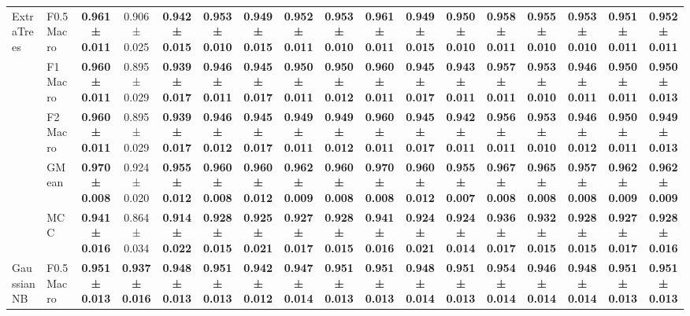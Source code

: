 \begin{table}[H]
{\begin{tabular}{llccccccccccccccc}
\cline{1-17}
\multirow[t]{5}{*}{ExtraTrees} & F0.5 Macro & \textbf{0.961 ± 0.011} & 0.906 ± 0.025 & \textbf{0.942 ± 0.015} & \textbf{0.953 ± 0.010} & \textbf{0.949 ± 0.015} & \textbf{0.952 ± 0.011} & \textbf{0.953 ± 0.010} & \textbf{0.961 ± 0.011} & \textbf{0.949 ± 0.015} & \textbf{0.950 ± 0.010} & \textbf{0.958 ± 0.011} & \textbf{0.955 ± 0.010} & \textbf{0.953 ± 0.010} & \textbf{0.951 ± 0.011} & \textbf{0.952 ± 0.011} \\
 & F1 Macro & \textbf{0.960 ± 0.011} & 0.895 ± 0.029 & \textbf{0.939 ± 0.017} & \textbf{0.946 ± 0.011} & \textbf{0.945 ± 0.017} & \textbf{0.950 ± 0.011} & \textbf{0.950 ± 0.012} & \textbf{0.960 ± 0.011} & \textbf{0.945 ± 0.017} & \textbf{0.943 ± 0.011} & \textbf{0.957 ± 0.011} & \textbf{0.953 ± 0.010} & \textbf{0.946 ± 0.011} & \textbf{0.950 ± 0.011} & \textbf{0.950 ± 0.013} \\
 & F2 Macro & \textbf{0.960 ± 0.011} & 0.895 ± 0.029 & \textbf{0.939 ± 0.017} & \textbf{0.946 ± 0.012} & \textbf{0.945 ± 0.017} & \textbf{0.949 ± 0.011} & \textbf{0.949 ± 0.012} & \textbf{0.960 ± 0.011} & \textbf{0.945 ± 0.017} & \textbf{0.942 ± 0.011} & \textbf{0.956 ± 0.011} & \textbf{0.953 ± 0.010} & \textbf{0.946 ± 0.012} & \textbf{0.950 ± 0.011} & \textbf{0.949 ± 0.013} \\
 & GMean & \textbf{0.970 ± 0.008} & 0.924 ± 0.020 & \textbf{0.955 ± 0.012} & \textbf{0.960 ± 0.008} & \textbf{0.960 ± 0.012} & \textbf{0.962 ± 0.009} & \textbf{0.960 ± 0.008} & \textbf{0.970 ± 0.008} & \textbf{0.960 ± 0.012} & \textbf{0.955 ± 0.007} & \textbf{0.967 ± 0.008} & \textbf{0.965 ± 0.008} & \textbf{0.957 ± 0.008} & \textbf{0.962 ± 0.009} & \textbf{0.962 ± 0.009} \\
 & MCC & \textbf{0.941 ± 0.016} & 0.864 ± 0.034 & \textbf{0.914 ± 0.022} & \textbf{0.928 ± 0.015} & \textbf{0.925 ± 0.021} & \textbf{0.927 ± 0.017} & \textbf{0.928 ± 0.015} & \textbf{0.941 ± 0.016} & \textbf{0.924 ± 0.021} & \textbf{0.924 ± 0.014} & \textbf{0.936 ± 0.017} & \textbf{0.932 ± 0.015} & \textbf{0.928 ± 0.015} & \textbf{0.927 ± 0.017} & \textbf{0.928 ± 0.016} \\
\cline{1-17}
\multirow[t]{5}{*}{GaussianNB} & F0.5 Macro & \textbf{0.951 ± 0.013} & \textbf{0.937 ± 0.016} & \textbf{0.948 ± 0.013} & \textbf{0.951 ± 0.013} & \textbf{0.942 ± 0.012} & \textbf{0.947 ± 0.014} & \textbf{0.951 ± 0.013} & \textbf{0.951 ± 0.013} & \textbf{0.948 ± 0.014} & \textbf{0.951 ± 0.013} & \textbf{0.954 ± 0.014} & \textbf{0.946 ± 0.014} & \textbf{0.948 ± 0.014} & \textbf{0.951 ± 0.013} & \textbf{0.951 ± 0.013} \\

\end{tabular}}
\end{table}

